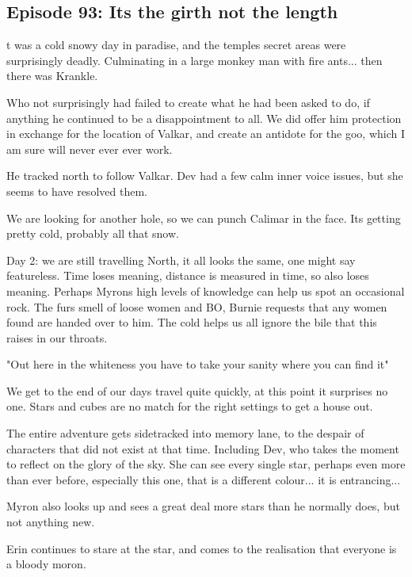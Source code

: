 \subsection{Episode 93: Its the girth not the length}

t was a cold snowy day in paradise, and the temples secret areas were surprisingly deadly. Culminating in a large monkey man with fire ants... then there was Krankle.\medskip

Who not surprisingly had failed to create what he had been asked to do, if anything he continued to be a disappointment to all. We did offer him protection in exchange for the location of Valkar, and create an antidote for the goo, which I am sure will never ever ever work.\medskip

He tracked north to follow Valkar. Dev had a few calm inner voice issues, but she seems to have resolved them.\medskip

We are looking for another hole, so we can punch Calimar in the face. Its getting pretty cold, probably all that snow.\medskip

Day 2: we are still travelling North, it all looks the same, one might say featureless. Time loses meaning, distance is measured in time, so also loses meaning. Perhaps Myrons high levels of knowledge can help us spot an occasional rock. The furs smell of loose women and BO, Burnie requests that any women found are handed over to him. The cold helps us all ignore the bile that this raises in our throats.\medskip

"Out here in the whiteness you have to take your sanity where you can find it"\medskip

We get to the end of our days travel quite quickly, at this point it surprises no one. Stars and cubes are no match for the right settings to get a house out.\medskip

The entire adventure gets sidetracked into memory lane, to the despair of characters that did not exist at that time. Including Dev, who takes the moment to reflect on the glory of the sky. She can see every single star, perhaps even more than ever before, especially this one, that is a different colour... it is entrancing...\medskip

Myron also looks up and sees a great deal more stars than he normally does, but not anything new.\medskip

Erin continues to stare at the star, and comes to the realisation that everyone is a bloody moron.\medskip

